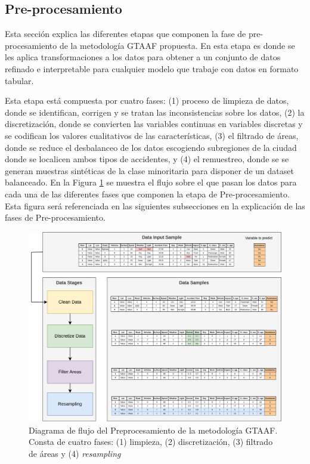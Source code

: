\subsection{Pre-procesamiento}

Esta sección explica las diferentes etapas que componen la fase de pre-procesamiento de la metodología GTAAF propuesta. En esta etapa es donde se les aplica transformaciones a los datos para obtener a un conjunto de datos refinado e interpretable para cualquier modelo que trabaje con datos en formato tabular. 

Esta etapa está compuesta por cuatro fases: (1) proceso de limpieza de datos, donde se identifican, corrigen y se tratan las inconsistencias sobre los datos, (2) la discretización, donde se convierten las variables continuas en variables discretas y se codifican los valores cualitativos de las características, (3) el filtrado de áreas, donde se reduce el desbalanceo de los datos escogiendo subregiones de la ciudad donde se localicen ambos tipos de accidentes, y (4) el remuestreo, donde se se generan muestras sintéticas de la clase minoritaria para disponer de un dataset balanceado. En la Figura \ref{PreprocessingStage} se muestra el flujo sobre el que pasan los datos para cada una de las diferentes fases que componen la etapa de Pre-procesamiento. Esta figura será referenciada en las siguientes subsecciones en la explicación de las fases de Pre-procesamiento.

\begin{figure}[H]
	\centering
	\includegraphics[width=14cm]{Figures/Preprocessing.png}
	\caption[Diagrama de flujo del Preprocesamiento de la metodología GTAAF] {Diagrama de flujo del Preprocesamiento de la metodología GTAAF. Consta de cuatro fases: (1) limpieza, (2) discretización, (3) filtrado de áreas y (4) \textit{resampling}}
	\label{PreprocessingStage}
\end{figure}

